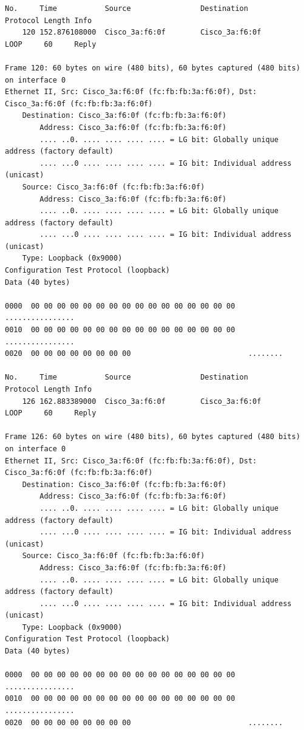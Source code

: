 \documentclass[a4paper,11pt]{article}
\begin{document}
\begin{lstlisting}
No.     Time           Source                Destination           Protocol Length Info
    120 152.876108000  Cisco_3a:f6:0f        Cisco_3a:f6:0f        LOOP     60     Reply

Frame 120: 60 bytes on wire (480 bits), 60 bytes captured (480 bits) on interface 0
Ethernet II, Src: Cisco_3a:f6:0f (fc:fb:fb:3a:f6:0f), Dst: Cisco_3a:f6:0f (fc:fb:fb:3a:f6:0f)
    Destination: Cisco_3a:f6:0f (fc:fb:fb:3a:f6:0f)
        Address: Cisco_3a:f6:0f (fc:fb:fb:3a:f6:0f)
        .... ..0. .... .... .... .... = LG bit: Globally unique address (factory default)
        .... ...0 .... .... .... .... = IG bit: Individual address (unicast)
    Source: Cisco_3a:f6:0f (fc:fb:fb:3a:f6:0f)
        Address: Cisco_3a:f6:0f (fc:fb:fb:3a:f6:0f)
        .... ..0. .... .... .... .... = LG bit: Globally unique address (factory default)
        .... ...0 .... .... .... .... = IG bit: Individual address (unicast)
    Type: Loopback (0x9000)
Configuration Test Protocol (loopback)
Data (40 bytes)

0000  00 00 00 00 00 00 00 00 00 00 00 00 00 00 00 00   ................
0010  00 00 00 00 00 00 00 00 00 00 00 00 00 00 00 00   ................
0020  00 00 00 00 00 00 00 00                           ........

No.     Time           Source                Destination           Protocol Length Info
    126 162.883389000  Cisco_3a:f6:0f        Cisco_3a:f6:0f        LOOP     60     Reply

Frame 126: 60 bytes on wire (480 bits), 60 bytes captured (480 bits) on interface 0
Ethernet II, Src: Cisco_3a:f6:0f (fc:fb:fb:3a:f6:0f), Dst: Cisco_3a:f6:0f (fc:fb:fb:3a:f6:0f)
    Destination: Cisco_3a:f6:0f (fc:fb:fb:3a:f6:0f)
        Address: Cisco_3a:f6:0f (fc:fb:fb:3a:f6:0f)
        .... ..0. .... .... .... .... = LG bit: Globally unique address (factory default)
        .... ...0 .... .... .... .... = IG bit: Individual address (unicast)
    Source: Cisco_3a:f6:0f (fc:fb:fb:3a:f6:0f)
        Address: Cisco_3a:f6:0f (fc:fb:fb:3a:f6:0f)
        .... ..0. .... .... .... .... = LG bit: Globally unique address (factory default)
        .... ...0 .... .... .... .... = IG bit: Individual address (unicast)
    Type: Loopback (0x9000)
Configuration Test Protocol (loopback)
Data (40 bytes)

0000  00 00 00 00 00 00 00 00 00 00 00 00 00 00 00 00   ................
0010  00 00 00 00 00 00 00 00 00 00 00 00 00 00 00 00   ................
0020  00 00 00 00 00 00 00 00                           ........


\end{lstlisting}
\end{document}

